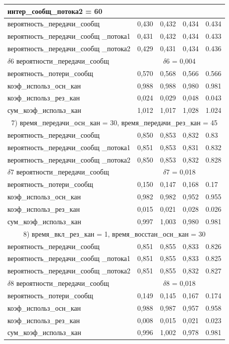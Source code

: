 \begin{longtable} {
	|p{}
	|p{}
	|p{}
	|p{}
	|p{}
	|}
{		интер\_сообщ\_потока2 = 60} \\ \hline
	вероятность\_передачи\_сообщ & 0,430 & 0,432 & 0,434 & 0.434 \\ \hline
	вероятность\_передачи\_сообщ \_потока1 & 0,431 & 0,432
		& 0,434 & 0.433 \\ \hline
	вероятность\_передачи\_сообщ \_потока2 & 0,429 & 0,431
		& 0,434 & 0.436 \\ \hline
	$\delta$6 вероятности\_передачи\_сообщ &
		\multicolumn{4}{|c|}{$\delta$6 = 0,004} \\ \hline
	вероятность\_потери\_сообщ & 0,570 & 0,568 & 0,566 & 0.566 \\ \hline
	коэф\_использ\_осн\_кан & 0,988 & 0,988 & 0,980 & 0.981 \\ \hline
	коэф\_использ\_рез\_кан & 0,024 & 0,029 & 0,048 & 0.043 \\ \hline
	сум\_коэф\_использ\_кан & 1,012 & 1,017 & 1,028 & 1.024 \\ \hline
	\multicolumn{5}{|c|}{7) время\_передачи\_осн\_кан = 30,
		время\_передачи\_рез\_кан = 45} \\ \hline
	вероятность\_передачи\_сообщ & 0,850 & 0,853 & 0,832 & 0.83 \\ \hline
	вероятность\_передачи\_сообщ \_потока1 & 0,851 & 0,853
		& 0,831 & 0.832 \\ \hline
	вероятность\_передачи\_сообщ \_потока2 & 0,850 & 0,853
		& 0,832 & 0.828 \\ \hline
	$\delta$7 вероятности\_передачи\_сообщ &
		\multicolumn{4}{|c|}{$\delta$7 = 0,018} \\ \hline
	вероятность\_потери\_сообщ & 0,150 & 0,147 & 0,168 & 0.17 \\ \hline
	коэф\_использ\_осн\_кан & 0,982 & 0,982 & 0,952 & 0.955 \\ \hline
	коэф\_использ\_рез\_кан & 0,015 & 0,021 & 0,028 & 0.026 \\ \hline
	сум\_коэф\_использ\_кан & 0,997 & 1,003 & 0,980 & 0.981 \\ \hline
	\multicolumn{5}{|c|}{8) время\_вкл\_рез\_кан = 1,
		время\_восстан\_осн\_кан = 30}  \\ \hline
	вероятность\_передачи\_сообщ & 0,851 & 0,855 & 0,833 & 0.826 \\ \hline
	вероятность\_передачи\_сообщ \_потока1 & 0,851 & 0,855
		& 0,833 & 0.825 \\ \hline
	вероятность\_передачи\_сообщ \_потока2 & 0,851 & 0,855
		& 0,832 & 0.827 \\ \hline
	$\delta$8 вероятности\_передачи\_сообщ &
		\multicolumn{4}{|c|}{$\delta$8 = 0,018} \\ \hline
	вероятность\_потери\_сообщ & 0,149 & 0,145 & 0,167 & 0.174 \\ \hline
	коэф\_использ\_осн\_кан & 0,988 & 0,987 & 0,957 & 0.958 \\ \hline
	коэф\_использ\_рез\_кан & 0,008 & 0,015 & 0,021 & 0.023 \\ \hline
	сум\_коэф\_использ\_кан & 0,996 & 1,002 & 0,978 & 0.981 \\ \hline

\end{longtable}

